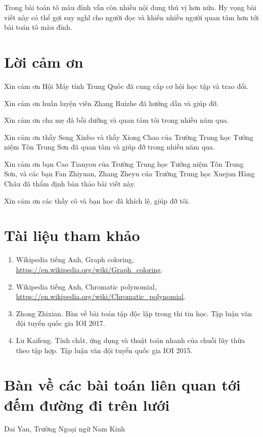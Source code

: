 \documentclass[11pt]{article}
\begin{document}
Trong bài toán tô màu đỉnh vẫn còn nhiều nội dung thú vị hơn nữa. Hy vọng bài
viết này có thể gợi suy nghĩ cho người đọc và khiến nhiều người quan tâm hơn
tới bài toán tô màu đỉnh.

\section*{Lời cảm ơn}

Xin cảm ơn Hội Máy tính Trung Quốc đã cung cấp cơ hội học tập và trao đổi.

Xin cảm ơn huấn luyện viên Zhang Ruizhe đã hướng dẫn và giúp đỡ.

Xin cảm ơn cha mẹ đã bồi dưỡng và quan tâm tôi trong nhiều năm qua.

Xin cảm ơn thầy Song Xinbo và thầy Xiong Chao của Trường Trung học Tưởng niệm
Tôn Trung Sơn đã quan tâm và giúp đỡ trong nhiều năm qua.

Xin cảm ơn bạn Cao Tianyou của Trường Trung học Tưởng niệm Tôn Trung Sơn, và
các bạn Fan Zhiyuan, Zhang Zheyu của Trường Trung học Xuejun Hàng Châu đã
thẩm định bản thảo bài viết này.

Xin cảm ơn các thầy cô và bạn học đã khích lệ, giúp đỡ tôi.

\section*{Tài liệu tham khảo}

\begin{enumerate}
  \item Wikipedia tiếng Anh, Graph coloring,
        \url{https://en.wikipedia.org/wiki/Graph_coloring}.
  \item Wikipedia tiếng Anh, Chromatic polynomial,
        \url{https://en.wikipedia.org/wiki/Chromatic_polynomial}.
  \item Zhong Zhixian. Bàn về bài toán tập độc lập trong thi tin học. Tập luận
        văn đội tuyển quốc gia IOI 2017.
  \item Lu Kaifeng. Tính chất, ứng dụng và thuật toán nhanh của chuỗi lũy thừa
        theo tập hợp. Tập luận văn đội tuyển quốc gia IOI 2015.
\end{enumerate}

\clearpage
\section*{Bàn về các bài toán liên quan tới đếm đường đi trên lưới}

\begin{center}
Dai Yan, Trường Ngoại ngữ Nam Kinh
\end{center}
\end{document}
